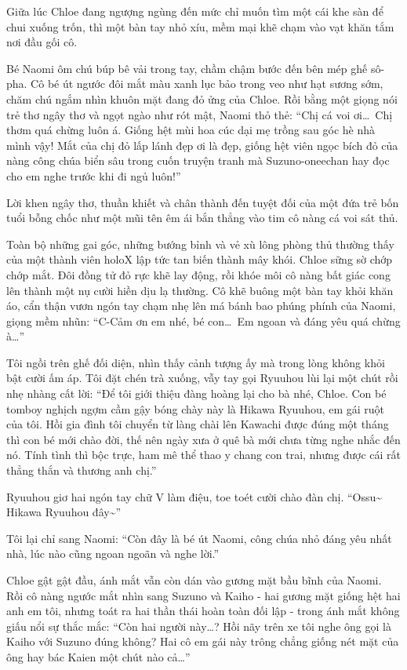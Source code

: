 \documentclass[../main.tex]{subfiles}
\begin{document}
Giữa lúc Chloe đang ngượng ngùng đến mức chỉ muốn tìm một cái khe sàn để chui xuống trốn, thì một bàn tay nhỏ xíu, mềm mại khẽ chạm vào vạt khăn tắm nơi đầu gối cô.

Bé Naomi ôm chú búp bê vải trong tay, chầm chậm bước đến bên mép ghế sô-pha. Cô bé út ngước đôi mắt màu xanh lục bảo trong veo như hạt sương sớm, chăm chú ngắm nhìn khuôn mặt đang đỏ ửng của Chloe. Rồi bằng một giọng nói trẻ thơ ngây thơ và ngọt ngào như rót mật, Naomi thỏ thẻ: ``Chị cá voi ơi\dots\ Chị thơm quá chừng luôn á. Giống hệt mùi hoa cúc dại mẹ trồng sau góc hè nhà mình vậy! Mắt của chị đỏ lấp lánh đẹp ơi là đẹp, giống hệt viên ngọc bích đỏ của nàng công chúa biển sâu trong cuốn truyện tranh mà Suzuno-oneechan hay đọc cho em nghe trước khi đi ngủ luôn!''

Lời khen ngây thơ, thuần khiết và chân thành đến tuyệt đối của một đứa trẻ bốn tuổi bỗng chốc như một mũi tên êm ái bắn thẳng vào tim cô nàng cá voi sát thủ.

Toàn bộ những gai góc, những bướng bỉnh và vẻ xù lông phòng thủ thường thấy của một thành viên holoX lập tức tan biến thành mây khói. Chloe sững sờ chớp chớp mắt. Đôi đồng tử đỏ rực khẽ lay động, rồi khóe môi cô nàng bất giác cong lên thành một nụ cười hiền dịu lạ thường. Cô khẽ buông một bàn tay khỏi khăn áo, cẩn thận vươn ngón tay chạm nhẹ lên má bánh bao phúng phính của Naomi, giọng mềm nhũn: ``C-Cảm ơn em nhé, bé con\dots\ Em ngoan và đáng yêu quá chừng à\dots''

Tôi ngồi trên ghế đối diện, nhìn thấy cảnh tượng ấy mà trong lòng không khỏi bật cười ấm áp. Tôi đặt chén trà xuống, vẫy tay gọi Ryuuhou lùi lại một chút rồi nhẹ nhàng cất lời: ``Để tôi giới thiệu đàng hoàng lại cho bà nhé, Chloe. Con bé tomboy nghịch ngợm cầm gậy bóng chày này là Hikawa Ryuuhou, em gái ruột của tôi. Hồi gia đình tôi chuyển từ làng chài lên Kawachi được đúng một tháng thì con bé mới chào đời, thế nên ngày xưa ở quê bà mới chưa từng nghe nhắc đến nó. Tính tình thì bộc trực, ham mê thể thao y chang con trai, nhưng được cái rất thẳng thắn và thương anh chị.''

Ryuuhou giơ hai ngón tay chữ V làm điệu, toe toét cười chào đàn chị. ``Ossu\~{} Hikawa Ryuuhou đây\~{}''

Tôi lại chỉ sang Naomi: ``Còn đây là bé út Naomi, công chúa nhỏ đáng yêu nhất nhà, lúc nào cũng ngoan ngoãn và nghe lời.''

Chloe gật gật đầu, ánh mắt vẫn còn dán vào gương mặt bầu bĩnh của Naomi. Rồi cô nàng ngước mắt nhìn sang Suzuno và Kaiho - hai gương mặt giống hệt hai anh em tôi, nhưng toát ra hai thần thái hoàn toàn đối lập - trong ánh mắt không giấu nổi sự thắc mắc: ``Còn hai người này\dots? Hồi nãy trên xe tôi nghe ông gọi là Kaiho với Suzuno đúng không? Hai cô em gái này trông chẳng giống nét mặt của ông hay bác Kaien một chút nào cả\dots''
\end{document}
